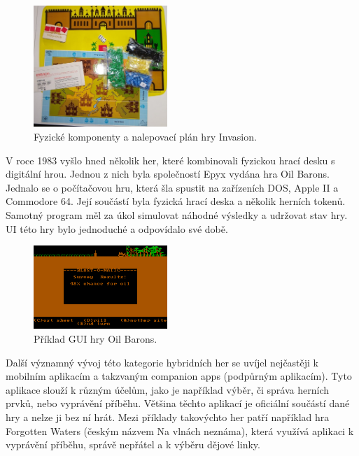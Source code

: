 \begin{figure}[H]
    \centering
    \includegraphics[width=0.45\textwidth]{resources/figures/invasion.jpg}
    \caption{Fyzické komponenty a nalepovací plán hry Invasion.\cite{invasion}}
    \label{fig:invasion}
\end{figure}

V roce 1983 vyšlo hned několik her, které kombinovali fyzickou hrací desku s digitální hrou. Jednou z nich byla společností Epyx vydána hra Oil Barons. Jednalo se o počítačovou hru, která šla spustit na zařízeních DOS, Apple II a Commodore 64. Její součástí byla fyzická hrací deska a několik herních tokenů. Samotný program měl za úkol simulovat náhodné výsledky a udržovat stav hry. UI této hry bylo jednoduché a odpovídalo své době.\cite{oil_barons}

\begin{figure}[H]
    \centering
    \includegraphics[width=0.45\textwidth]{resources/figures/oil_barons.png}
    \caption{Příklad GUI hry Oil Barons.\cite{oil_barons}}
    \label{fig:oil_barons}
\end{figure}

Další významný vývoj této kategorie hybridních her se uvíjel nejčastěji k mobilním aplikacím a takzvaným companion apps (podpůrným aplikacím). Tyto aplikace slouží k různým účelům, jako je například výběr, či správa herních prvků, nebo vyprávění příběhu. Většina těchto aplikací je oficiální součástí dané hry a nelze ji bez ní hrát. Mezi příklady takovýchto her patří například hra Forgotten Waters (českým názvem Na vlnách neznáma), která využívá aplikaci k vyprávění příběhu, správě nepřátel a k výběru dějové linky.

